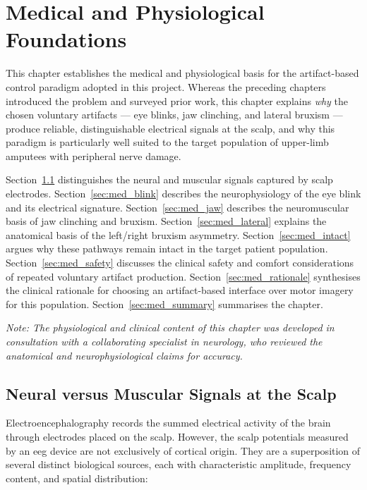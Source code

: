 \chapter{Medical and Physiological Foundations}
\label{ch:medical}

This chapter establishes the medical and physiological basis for the
artifact-based control paradigm adopted in this project. Whereas the
preceding chapters introduced the problem and surveyed prior work,
this chapter explains \emph{why} the chosen voluntary artifacts ---
eye blinks, jaw clinching, and lateral bruxism --- produce reliable,
distinguishable electrical signals at the scalp, and why this paradigm
is particularly well suited to the target population of upper-limb
amputees with peripheral nerve damage.

Section~\ref{sec:med_signals} distinguishes the neural and muscular
signals captured by scalp electrodes.
Section~\ref{sec:med_blink} describes the neurophysiology of the eye
blink and its electrical signature.
Section~\ref{sec:med_jaw} describes the neuromuscular basis of jaw
clinching and bruxism.
Section~\ref{sec:med_lateral} explains the anatomical basis of the
left/right bruxism asymmetry.
Section~\ref{sec:med_intact} argues why these pathways remain intact
in the target patient population.
Section~\ref{sec:med_safety} discusses the clinical safety and
comfort considerations of repeated voluntary artifact production.
Section~\ref{sec:med_rationale} synthesises the clinical rationale
for choosing an artifact-based interface over motor imagery for this
population. Section~\ref{sec:med_summary} summarises the chapter.

\medskip
\noindent\textit{Note: The physiological and clinical content of this
chapter was developed in consultation with a collaborating
specialist in neurology, who reviewed the anatomical and
neurophysiological claims for accuracy.}

\section{Neural versus Muscular Signals at the Scalp}
\label{sec:med_signals}

Electroencephalography records the summed electrical activity of the
brain through electrodes placed on the scalp. However, the scalp
potentials measured by an \acrshort{eeg} device are not exclusively
of cortical origin. They are a superposition of several distinct
biological sources, each with characteristic amplitude, frequency
content, and spatial distribution:

